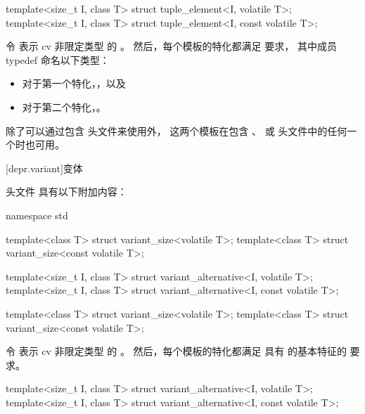 \begin{itemdecl}
template<size_t I, class T> struct tuple_element<I, volatile T>;
template<size_t I, class T> struct tuple_element<I, const volatile T>;
\end{itemdecl}

\begin{itemdescr}
\pnum
令  表示 cv 非限定类型  的 。
然后，每个模板的特化都满足
 要求，
其中成员 typedef  命名以下类型：
\begin{itemize}
\item 对于第一个特化，，以及
\item 对于第二个特化，。
\end{itemize}

\pnum
除了可以通过包含  头文件来使用外，
这两个模板在包含
、
 或
头文件中的任何一个时也可用。
\end{itemdescr}

[depr.variant]{变体}

\pnum
头文件  具有以下附加内容：

\begin{codeblock}
namespace std {
  template<class T> struct variant_size<volatile T>;
  template<class T> struct variant_size<const volatile T>;

  template<size_t I, class T> struct variant_alternative<I, volatile T>;
  template<size_t I, class T> struct variant_alternative<I, const volatile T>;
}
\end{codeblock}

\begin{itemdecl}
template<class T> struct variant_size<volatile T>;
template<class T> struct variant_size<const volatile T>;
\end{itemdecl}

\begin{itemdescr}
\pnum
令  表示 cv 非限定类型 
的 。
然后，每个模板的特化都满足
具有  的基本特征的  要求。
\end{itemdescr}

\begin{itemdecl}
template<size_t I, class T> struct variant_alternative<I, volatile T>;
template<size_t I, class T> struct variant_alternative<I, const volatile T>;
\end{itemdecl}

